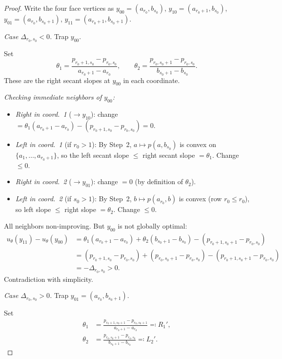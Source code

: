 \documentclass[11pt]{article}
\begin{document}
\begin{proof}
Write the four face vertices as $y_{00} = (a_{r_0}, b_{s_0})$,
$y_{10} = (a_{r_0+1}, b_{s_0})$, $y_{01} = (a_{r_0}, b_{s_0+1})$,
$y_{11} = (a_{r_0+1}, b_{s_0+1})$.

\medskip
\emph{Case $\Delta_{r_0, s_0} < 0$.}  Trap $y_{00}$.

Set
\[
  \theta_1 = \frac{p_{r_0+1,s_0} - p_{r_0,s_0}}{a_{r_0+1} - a_{r_0}},
  \qquad
  \theta_2 = \frac{p_{r_0,s_0+1} - p_{r_0,s_0}}{b_{s_0+1} - b_{s_0}}.
\]
These are the right secant slopes at $y_{00}$ in each coordinate.

\emph{Checking immediate neighbors of $y_{00}$:}
\begin{itemize}
  \item \emph{Right in coord.~1} ($\to y_{10}$):
    change $= \theta_1(a_{r_0+1} - a_{r_0}) - (p_{r_0+1,s_0} -
    p_{r_0,s_0}) = 0$.

  \item \emph{Left in coord.~1} (if $r_0 > 1$):
    By Step~2, $a \mapsto p(a, b_{s_0})$ is convex on
    $\{a_1, \dots, a_{r_0+1}\}$, so the left secant slope $\leq$
    right secant slope $= \theta_1$.  Change $\leq 0$.

  \item \emph{Right in coord.~2} ($\to y_{01}$):
    change $= 0$ (by definition of $\theta_2$).

  \item \emph{Left in coord.~2} (if $s_0 > 1$):
    By Step~2, $b \mapsto p(a_{r_0}, b)$ is convex (row $r_0 \leq r_0$),
    so left slope $\leq$ right slope $= \theta_2$.  Change $\leq 0$.
\end{itemize}

All neighbors non-improving.  But $y_{00}$ is not globally optimal:
\begin{align*}
  u_\theta(y_{11}) - u_\theta(y_{00})
  &= \theta_1(a_{r_0+1} - a_{r_0}) + \theta_2(b_{s_0+1} - b_{s_0})
  - (p_{r_0+1,s_0+1} - p_{r_0,s_0}) \\
  &= (p_{r_0+1,s_0} - p_{r_0,s_0}) + (p_{r_0,s_0+1} - p_{r_0,s_0})
  - (p_{r_0+1,s_0+1} - p_{r_0,s_0}) \\
  &= -\Delta_{r_0,s_0} > 0.
\end{align*}
Contradiction with simplicity.

\medskip
\emph{Case $\Delta_{r_0, s_0} > 0$.}  Trap $y_{01} = (a_{r_0}, b_{s_0+1})$.

Set
\begin{align*}
  \theta_1 &= \frac{p_{r_0+1,s_0+1} - p_{r_0,s_0+1}}{a_{r_0+1} - a_{r_0}}
  \eqqcolon R_1', \\
  \theta_2 &= \frac{p_{r_0,s_0+1} - p_{r_0,s_0}}{b_{s_0+1} - b_{s_0}}
  \eqqcolon L_2'.
\end{align*}


\end{proof}
\end{document}
